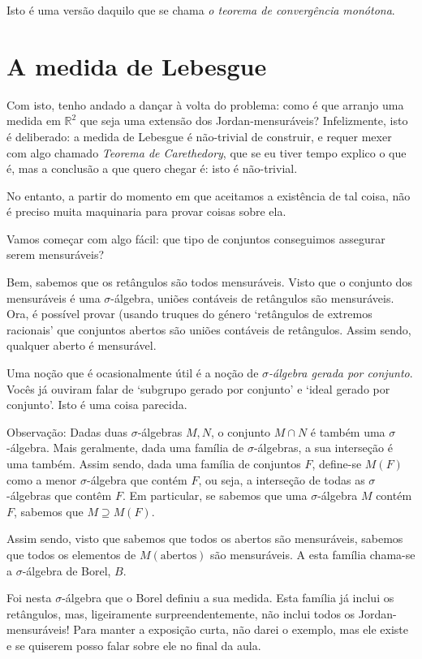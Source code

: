\documentclass{article}
\newcommand{\R}{\mathbb{R}}
\begin{document}
Isto é uma versão daquilo que se chama \emph{o teorema de convergência monótona}.

\section{A medida de Lebesgue}

Com isto, tenho andado a dançar à volta do problema: como é que arranjo uma medida em $\R^2$ que seja uma extensão dos Jordan-mensuráveis? Infelizmente, isto é deliberado: a medida de Lebesgue é não-trivial de construir, e requer mexer com algo chamado \emph{Teorema de Carethedory}, que se eu tiver tempo explico o que é, mas a conclusão a que quero chegar é: isto é não-trivial.

No entanto, a partir do momento em que aceitamos a existência de tal coisa, não é preciso muita maquinaria para provar coisas sobre ela.

Vamos começar com algo fácil: que tipo de conjuntos conseguimos assegurar serem mensuráveis?

Bem, sabemos que os retângulos são todos mensuráveis. Visto que o conjunto dos mensuráveis é uma $\sigma$-álgebra, uniões contáveis de retângulos são mensuráveis. Ora, é possível provar (usando truques do género `retângulos de extremos racionais' que conjuntos abertos são uniões contáveis de retângulos. Assim sendo, qualquer aberto é mensurável.

Uma noção que é ocasionalmente útil é a noção de \emph{$\sigma$-álgebra gerada por conjunto}. Vocês já ouviram falar de `subgrupo gerado por conjunto' e `ideal gerado por conjunto'. Isto é uma coisa parecida.

Observação: Dadas duas $\sigma$-álgebras $M, N$, o conjunto $M \cap N$ é também uma $\sigma$-álgebra. Mais geralmente, dada uma família de $\sigma$-álgebras, a sua interseção é uma também. Assim sendo, dada uma família de conjuntos $F$, define-se $M(F)$ como a menor $\sigma$-álgebra que contém $F$, ou seja, a interseção de todas as $\sigma$-álgebras que contêm $F$. Em particular, se sabemos que uma $\sigma$-álgebra $M$ contém $F$, sabemos que $M \supseteq M(F)$.

Assim sendo, visto que sabemos que todos os abertos são mensuráveis, sabemos que todos os elementos de $M(\text{abertos})$ são mensuráveis. A esta família chama-se a $\sigma$-álgebra de Borel, $B$.

Foi nesta $\sigma$-álgebra que o Borel definiu a sua medida. Esta família já inclui os retângulos, mas, ligeiramente surpreendentemente, não inclui todos os Jordan-mensuráveis! Para manter a exposição curta, não darei o exemplo, mas ele existe e se quiserem posso falar sobre ele no final da aula.
\end{document}
